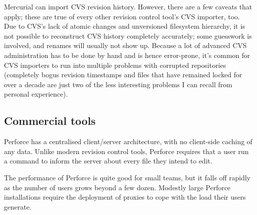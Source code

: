 Mercurial can import CVS revision history.  However, there are a few
caveats that apply; these are true of every other revision control
tool's CVS importer, too.  Due to CVS's lack of atomic changes and
unversioned filesystem hierarchy, it is not possible to reconstruct
CVS history completely accurately; some guesswork is involved, and
renames will usually not show up.  Because a lot of advanced CVS
administration has to be done by hand and is hence error-prone, it's
common for CVS importers to run into multiple problems with corrupted
repositories (completely bogus revision timestamps and files that have
remained locked for over a decade are just two of the less interesting
problems I can recall from personal experience).

\subsection{Commercial tools}

Perforce has a centralised client/server architecture, with no
client-side caching of any data.  Unlike modern revision control
tools, Perforce requires that a user run a command to inform the
server about every file they intend to edit.

The performance of Perforce is quite good for small teams, but it
falls off rapidly as the number of users grows beyond a few dozen.
Modestly large Perforce installations require the deployment of
proxies to cope with the load their users generate.

